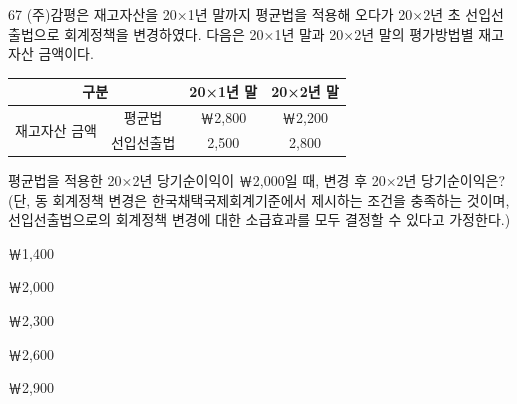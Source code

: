 \begin{question}{67}
(주)감평은 재고자산을 20×1년 말까지 평균법을 적용해 오다가 20×2년 초 선입선출법으로 회계정책을 변경하였다. 다음은 20×1년 말과 20×2년 말의 평가방법별 재고자산 금액이다.

{\small\centering\begin{tabular}{|c|c|c|c|}\hline
\multicolumn{2}{|c|}{구분} & 20×1년 말 & 20×2년 말 \\ \hline
\multirow{2}{*}{재고자산 금액} & 평균법 & ￦2,800 & ￦2,200 \\ \cline{2-4}
 & 선입선출법 & 2,500 & 2,800 \\ \hline
\end{tabular}\par}
\vspace{4pt}
평균법을 적용한 20×2년 당기순이익이 ￦2,000일 때, 변경 후 20×2년 당기순이익은? (단, 동 회계정책 변경은 한국채택국제회계기준에서 제시하는 조건을 충족하는 것이며, 선입선출법으로의 회계정책 변경에 대한 소급효과를 모두 결정할 수 있다고 가정한다.)
\begin{choices}
  \item ￦1,400
  \item ￦2,000
  \item ￦2,300
  \item ￦2,600
  \item ￦2,900
\end{choices}
\end{question}
